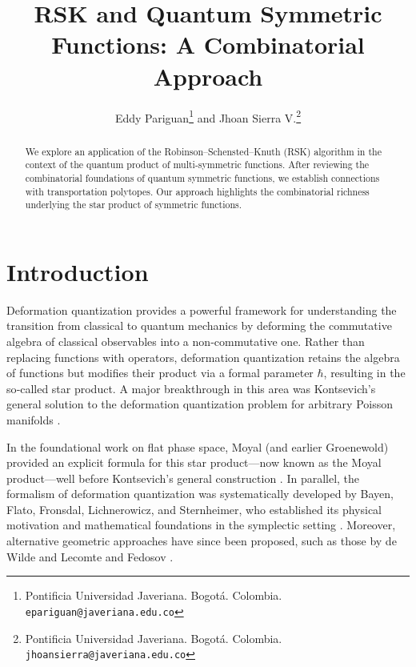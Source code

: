 \documentclass[11pt]{article}
\begin{document}
\setlength{\baselineskip}{16pt}
\title{RSK and Quantum Symmetric Functions: A Combinatorial Approach}
\author{Eddy Pariguan{\footnote{ Pontificia Universidad Javeriana. Bogotá. Colombia.
\texttt{epariguan@javeriana.edu.co} }} and   Jhoan  Sierra V.{\footnote{ Pontificia Universidad Javeriana. Bogotá.
 Colombia. \texttt{jhoansierra@javeriana.edu.co} }}}
\maketitle
\begin{abstract}
We explore an application of the Robinson–Schensted–Knuth (RSK) algorithm in the context of the quantum product of multi-symmetric functions. After reviewing the combinatorial foundations of quantum symmetric functions, we establish connections with transportation polytopes. Our approach highlights the combinatorial richness underlying the star product of symmetric functions.

\end{abstract}

\section*{Introduction}

Deformation quantization provides a powerful framework for understanding the transition from classical to quantum mechanics by deforming the commutative algebra of classical observables into a non‑commutative one. Rather than replacing functions with operators, deformation quantization retains the algebra of functions but modifies their product via a formal parameter \(\hbar\), resulting in the so‑called star product. A major breakthrough in this area was Kontsevich’s general solution to the deformation quantization problem for arbitrary Poisson manifolds \cite{Kon}.

In the foundational work on flat phase space, Moyal (and earlier Groenewold) provided an explicit formula for this star product—now known as the Moyal product—well before Kontsevich’s general construction \cite{Groenewold,Moyal}.
In parallel, the formalism of deformation quantization was systematically developed by Bayen, Flato, Fronsdal, Lichnerowicz, and Sternheimer, who established its physical motivation and mathematical foundations in the symplectic setting \cite{Bayen}. Moreover, alternative geometric approaches have since been proposed, such as those by de Wilde and Lecomte \cite{deWildeLecomte} and Fedosov \cite{Fedosov}.
\end{document}
